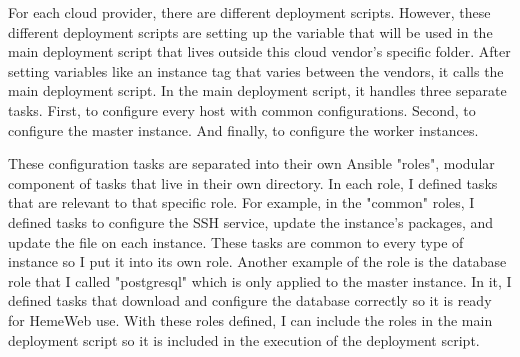 For each cloud provider, there are different deployment scripts. However, these different deployment scripts are setting up the variable that will be used in the main deployment script that lives outside this cloud vendor's specific folder. After setting variables like an instance tag that varies between the vendors, it calls the main deployment script. In the main deployment script, it handles three separate tasks. First, to configure every host with common configurations. Second, to configure the master instance. And finally, to configure the worker instances.

These configuration tasks are separated into their own Ansible "roles", modular component of tasks that live in their own directory. In each role, I defined tasks that are relevant to that specific role. For example, in the "common" roles, I defined tasks to configure the SSH service, update the instance's packages, and update the  file on each instance. These tasks are common to every type of instance so I put it into its own role. Another  example of the role is the database role that I called "postgresql" which is only applied to the master instance. In it, I defined tasks that download and configure the database correctly so it is ready for HemeWeb use. With these roles defined, I can include the roles in the main deployment script so it is included in the execution of the deployment script.
%
%




